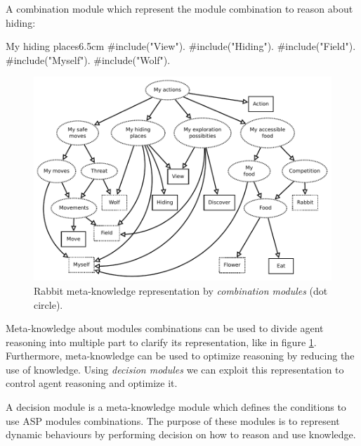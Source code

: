 \documentclass{aamas2012}
\begin{document}
	\begin{example}
		\label{hiding_example}
		A combination module which represent the module combination to reason about hiding:\newline
		\begin{module}{My hiding places}{6.5cm}
			\#include("View").\newline
			\#include("Hiding").\newline
			\#include("Field").\newline
			\#include("Myself").\newline
			\#include("Wolf").
		\end{module}
	\end{example}
	
	\begin{figure}
		\centering
		\includegraphics[keepaspectratio=true, scale=0.55]{meta_knowledge.pdf}
		\caption
		{
			\label{meta-knowledge}
			Rabbit meta-knowledge representation by \emph{combination modules} (dot circle).
		}
	\end{figure}
	
	Meta-knowledge about modules combinations can be used to divide agent reasoning into multiple part to clarify its representation,
	like in figure \ref{meta-knowledge}.
	Furthermore, meta-knowledge can be used to optimize reasoning by reducing the use of knowledge.
	Using \emph{decision modules} we can exploit this representation to control agent reasoning and optimize it.
	
	\begin{definition}
		A decision module is a meta-knowledge module which defines the conditions to use ASP modules combinations.	
		The purpose of these modules is to represent dynamic behaviours by performing decision on how to reason and use knowledge.
	\end{definition}
	
\end{document}
